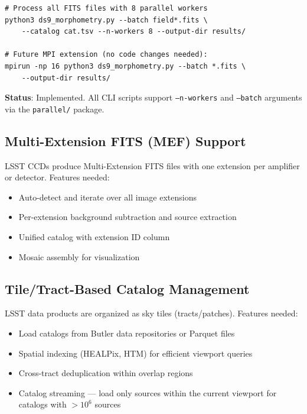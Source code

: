 \documentclass[11pt,fleqn]{book}
\begin{document}
\begin{codebox}
\begin{lstlisting}[style=bash,numbers=none]
# Process all FITS files with 8 parallel workers
python3 ds9_morphometry.py --batch field*.fits \
    --catalog cat.tsv --n-workers 8 --output-dir results/

# Future MPI extension (no code changes needed):
mpirun -np 16 python3 ds9_morphometry.py --batch *.fits \
    --output-dir results/
\end{lstlisting}
\end{codebox}

\textbf{Status}: Implemented. All CLI scripts support \texttt{--n-workers} and \texttt{--batch} arguments via the \texttt{parallel/} package.

\subsection{Multi-Extension FITS (MEF) Support}

LSST CCDs produce Multi-Extension FITS files with one extension per amplifier or detector. Features needed:
\begin{itemize}[leftmargin=2em]
  \item Auto-detect and iterate over all image extensions
  \item Per-extension background subtraction and source extraction
  \item Unified catalog with extension ID column
  \item Mosaic assembly for visualization
\end{itemize}

\subsection{Tile/Tract-Based Catalog Management}

LSST data products are organized as sky tiles (tracts/patches). Features needed:
\begin{itemize}[leftmargin=2em]
  \item Load catalogs from Butler data repositories or Parquet files
  \item Spatial indexing (HEALPix, HTM) for efficient viewport queries
  \item Cross-tract deduplication within overlap regions
  \item Catalog streaming --- load only sources within the current viewport for catalogs with $>10^6$ sources
\end{itemize}
\end{document}
